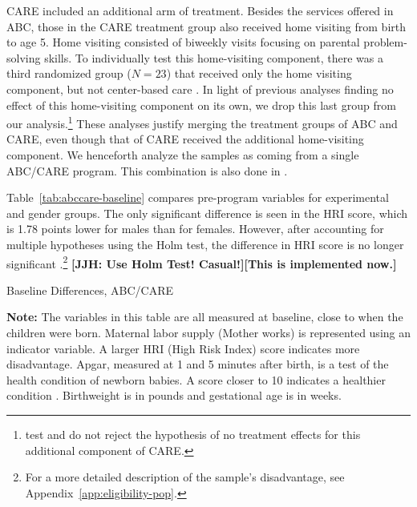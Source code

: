 CARE included an additional arm of treatment. Besides the services offered in ABC, those in the CARE treatment group also received home visiting from birth to age 5. Home visiting consisted of biweekly visits focusing on parental problem-solving skills. To individually test this home-visiting component, there was a third randomized group ($N=23$) that received only the home visiting component, but not center-based care \citep{Wasik_Ramey_etal_1990_CD}. In light of previous analyses finding no effect of this home-visiting component on its own, we drop this last group from our analysis.\footnote{\citet{Campbell_Conti_etal_2014_EarlyChildhoodInvestments} test and do not reject the hypothesis of no treatment effects for this additional component of CARE.} These analyses justify merging the treatment groups of ABC and CARE, even though that of CARE received the additional home-visiting component. We henceforth analyze the samples as coming from a single ABC/CARE program. This combination is also done in \citet{Burchinal_etal_2006_MSRCD_IV-Growth-Curve}.

Table~\ref{tab:abccare-baseline} compares pre-program variables for experimental and gender groups. The only significant difference is seen in the HRI score, which is 1.78 points lower for males than for females. However, after accounting for multiple hypotheses using the Holm test, the difference in HRI score is no longer significant \citep{Holme_1979_Sequential_SJS}.\footnote{For a more detailed description of the sample's disadvantage, see Appendix~\ref{app:eligibility-pop}.} \textbf{[JJH: Use Holm Test! Casual!][This is implemented now.]}

\begin{table}[!htbp]
\centering
\caption{Baseline Differences, ABC/CARE}
\label{tab:abccare-baseline}
\begin{threeparttable}
	
\begin{tablenotes}
\footnotesize
\item \textbf{Note:} The variables in this table are all measured at baseline, close to when the children were born. Maternal labor supply (Mother works) is represented using an indicator variable. A larger HRI (High Risk Index) score indicates more disadvantage. Apgar, measured at 1 and 5 minutes after birth, is a test of the health condition of newborn babies. A score closer to 10 indicates a healthier condition \citep{Apgar_1966_APGAR-Scoring_PCNA}. Birthweight is in pounds and gestational age is in weeks.
\end{tablenotes}
\end{threeparttable}
\end{table}

